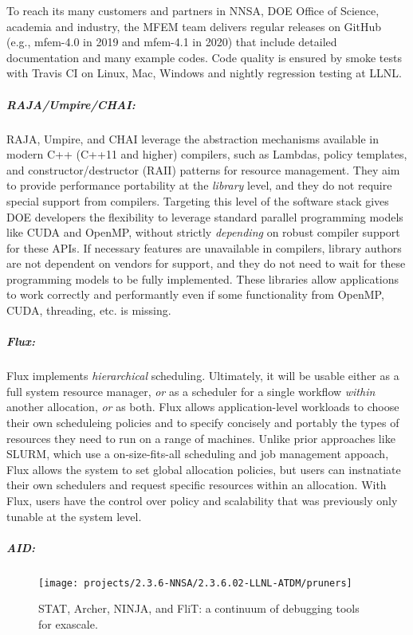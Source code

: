 To reach its many customers and partners in NNSA, DOE Office of Science,
academia and industry, the MFEM team delivers regular releases on GitHub
(e.g., mfem-4.0 in 2019 and mfem-4.1 in 2020) that include
detailed documentation and many example codes.  Code quality is ensured
by smoke tests with Travis CI on Linux, Mac, Windows and nightly
regression testing at LLNL.

\subparagraph{RAJA/Umpire/CHAI:}
RAJA, Umpire, and CHAI leverage the abstraction mechanisms available in
modern C++ (C++11 and higher) compilers, such as Lambdas, policy
templates, and constructor/destructor (RAII) patterns for resource
management.  They aim to provide performance portability at the {\it
library} level, and they do not require special support from compilers.
Targeting this level of the software stack gives DOE developers the
flexibility to leverage standard parallel programming models like CUDA
and OpenMP, without strictly {\it depending} on robust compiler support
for these APIs.  If necessary features are unavailable in compilers,
library authors are not dependent on vendors for support, and they do not
need to wait for these programming models to be fully implemented.  These
libraries allow applications to work correctly and performantly even if
some functionality from OpenMP, CUDA, threading, etc. is missing.

\subparagraph{Flux:}
Flux implements {\it hierarchical} scheduling.  Ultimately, it will be
usable either as a full system resource manager, {\it or} as a scheduler
for a single workflow {\it within} another allocation, {\it or} as both.
Flux allows application-level workloads to choose their own scheduleing
policies and to specify concisely and portably the types of resources
they need to run on a range of machines.  Unlike prior approaches like
SLURM, which use a on-size-fits-all scheduling and job management
appoach, Flux allows the system to set global allocation policies, but
users can instnatiate their own schedulers and request specific resources
within an allocation.  With Flux, users have the control over policy and
scalability that was previously only tunable at the system level.

\subparagraph{AID:}

\begin{figure}[htb]
\centering
\texttt{[image: projects/2.3.6-NNSA/2.3.6.02-LLNL-ATDM/pruners]}
\caption{
STAT, Archer, NINJA, and FliT: a continuum of debugging tools for exascale.
}
\end{figure}

